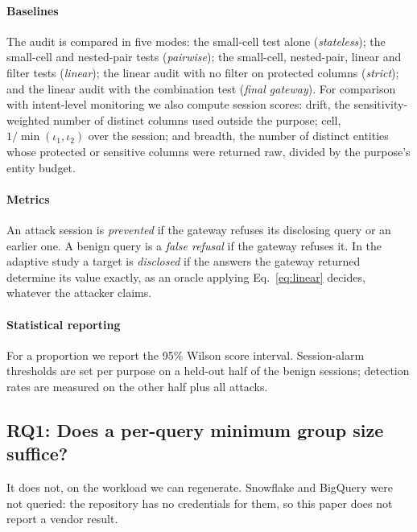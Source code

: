 \documentclass[sigconf,nonacm]{acmart}
\begin{document}
\paragraph{Baselines} The audit is compared in five modes: the small-cell test alone (\emph{stateless}); the small-cell and nested-pair tests (\emph{pairwise}); the small-cell, nested-pair, linear and filter tests (\emph{linear}); the linear audit with no filter on protected columns (\emph{strict}); and the linear audit with the combination test (\emph{final gateway}). For comparison with intent-level monitoring we also compute session scores: drift, the sensitivity-weighted number of distinct columns used outside the purpose; cell, $1/\min(\iota_1,\iota_2)$ over the session; and breadth, the number of distinct entities whose protected or sensitive columns were returned raw, divided by the purpose's entity budget.

\paragraph{Metrics} An attack session is \emph{prevented} if the gateway refuses its disclosing query or an earlier one. A benign query is a \emph{false refusal} if the gateway refuses it. In the adaptive study a target is \emph{disclosed} if the answers the gateway returned determine its value exactly, as an oracle applying Eq.~\ref{eq:linear} decides, whatever the attacker claims.

\paragraph{Statistical reporting} For a proportion we report the 95\% Wilson score interval. Session-alarm thresholds are set per purpose on a held-out half of the benign sessions; detection rates are measured on the other half plus all attacks.

\subsection{RQ1: Does a per-query minimum group size suffice?}\label{sec:gap}
It does not, on the workload we can regenerate. Snowflake and BigQuery were not queried: the repository has no credentials for them, so this paper does not report a vendor result.
\end{document}
